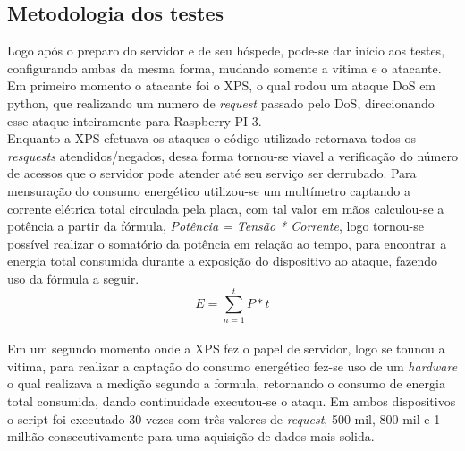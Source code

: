 \documentclass[12pt]{article}
\begin{document}
  \subsection{Metodologia dos testes} \label{sec:testes}
  
    Logo após o preparo do servidor e de seu hóspede, pode-se dar início aos testes, configurando ambas da mesma forma, mudando somente a vitima e o atacante. Em primeiro momento o atacante foi o XPS, o qual rodou um ataque DoS em python, que realizando um numero de \textit{request} passado pelo DoS, direcionando esse ataque inteiramente para Raspberry PI 3.\\
    Enquanto a XPS efetuava os ataques o código utilizado retornava todos os \textit{resquests} atendidos/negados, dessa forma tornou-se viavel a verificação do número de acessos que o servidor pode atender até seu serviço ser derrubado. Para mensuração do consumo energético utilizou-se um multímetro captando a corrente elétrica total circulada pela placa, com tal valor em mãos calculou-se a potência a partir da fórmula, \textit{Potência = Tensão * Corrente}, logo tornou-se possível realizar o somatório da potência em relação ao tempo, para encontrar a energia total consumida durante a exposição do dispositivo ao ataque, fazendo uso da fórmula a seguir. $$E = \sum_{n=1}^{t} P*t$$ \\
    Em um segundo momento onde a XPS fez o papel de servidor, logo se tounou a vitima, para realizar a captação do consumo energético fez-se uso de um \textit{hardware} o qual realizava a medição segundo a formula, retornando o consumo de energia total consumida, dando continuidade executou-se o ataqu. Em ambos dispositivos o script foi executado 30 vezes com três valores de \textit{request}, 500 mil, 800 mil e 1 milhão consecutivamente para uma aquisição de dados mais solida.
\end{document}
